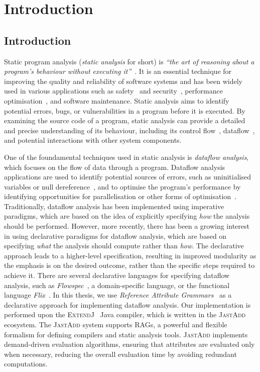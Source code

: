 \chapter{Introduction}
\section{Introduction}

Static program analysis (\emph{static analysis} for short) is
\emph{``the art of reasoning about a program's behaviour without executing it''}~\cite{spa}.
It is an essential technique for improving the quality and reliability of software
systems and has been widely used in various applications such
as safety~\cite{cousot2005astree,Blanchet2002} and security~\cite{piskachev2021secucheck,flowDroid,ayewah2008using,Sayar_2022,fink2012wala},
performance optimisation~\cite{aho2007compilers,appel2004modern}, and software maintenance.
Static analysis aims to identify potential errors, bugs, or vulnerabilities
in a program before it is executed.
By examining the source code of a program, static
analysis can provide a detailed and precise understanding of its behaviour, including
its control flow~\cite{allen1970control}, dataflow~\cite{kam1977monotone},
and potential interactions with other system components.



One of the foundamental techniques used in static analysis is \emph{dataflow analysis},
which focuses on the flow of data through a program. Dataflow analysis applications are used to identify
potential sources of errors, such as uninitialised variables or null dereference~\cite{khedker2017data},
and to optimise the program's performance by identifying opportunities for
parallelisation or other forms of optimisation~\cite{aho2007compilers}.
Traditionally, dataflow analysis has been implemented using imperative paradigms,
which are based on the idea of explicitly specifying \emph{how} the analysis should be
performed.
However, more recently, there has been a growing interest in using
declarative paradigms for dataflow analysis, which are based on specifying \emph{what}
the analysis should compute rather than \emph{how}.
The declarative approach leads to a higher-level specification, resulting in improved modularity as
the emphasis is on the desired outcome, rather than the specific steps required to 
achieve it.
There are several declarative languages for specifying dataflow analysis, 
such as \emph{Flowspec}~\cite{smits2020flowspec}, a domain-specific language,
or the functional language \emph{Flix}~\cite{madsen2016programming}. In this thesis, we use \emph{Reference 
Attribute Grammars}~\cite{hedin2000rags} as a declarative approach for implementing dataflow analysis. 
Our implementation is performed upon the \textsc{ExtendJ}~\cite{ekman2007jastadd} Java compiler,
which is written in the \textsc{JastAdd}~\cite{DBLP:journals/entcs/HedinM01} ecosystem.
The \textsc{JastAdd} system supports RAGs, a powerful and flexible
formalism for defining compilers and static analysis tools. 
\textsc{JastAdd} implements demand-driven evaluation algorithms, ensuring that attributes are evaluated only 
when necessary, reducing the overall evaluation time by avoiding redundant
computations.

